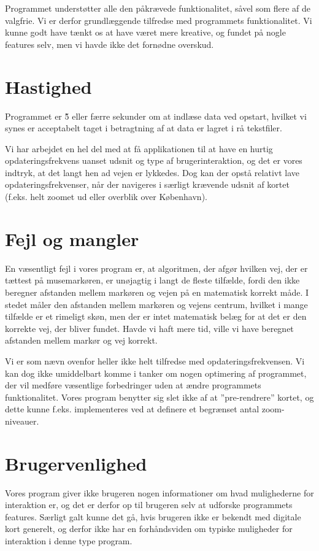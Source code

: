 Programmet understøtter alle den påkrævede funktionalitet, såvel som flere af de valgfrie. Vi er derfor grundlæggende tilfredse med programmets funktionalitet. Vi kunne godt have tænkt os at have været mere kreative, og fundet på nogle features selv, men vi havde ikke det fornødne overskud.

\section{Hastighed}

Programmet er \~5 eller færre sekunder om at indlæse data ved opstart, hvilket vi synes er acceptabelt taget i betragtning af at data er lagret i rå tekstfiler.

Vi har arbejdet en hel del med at få applikationen til at have en hurtig opdateringsfrekvens uanset udsnit og type af brugerinteraktion, og det er vores indtryk, at det langt hen ad vejen er lykkedes. Dog kan der opstå relativt lave opdateringsfrekvenser, når der navigeres i særligt krævende udsnit af kortet (f.eks. helt zoomet ud eller overblik over København).

\section{Fejl og mangler}

En væsentligt fejl i vores program er, at algoritmen, der afgør hvilken vej, der er tættest på musemarkøren, er unøjagtig i langt de fleste tilfælde, fordi den ikke beregner afstanden mellem markøren og vejen på en matematisk korrekt måde. I stedet måler den afstanden mellem markøren og vejens centrum, hvilket i mange tilfælde er et rimeligt skøn, men der er intet matematisk belæg for at det er den korrekte vej, der bliver fundet. Havde vi haft mere tid, ville vi have beregnet afstanden mellem markør og vej korrekt.

Vi er som nævn ovenfor heller ikke helt tilfredse med opdateringsfrekvensen. Vi kan dog ikke umiddelbart komme i tanker om nogen optimering af programmet, der vil medføre væsentlige forbedringer uden at ændre programmets funktionalitet. Vores program benytter sig slet ikke af at ''pre-rendrere'' kortet, og dette kunne f.eks. implementeres ved at definere et begrænset antal zoom-niveauer.

\section{Brugervenlighed}

Vores program giver ikke brugeren nogen informationer om hvad mulighederne for interaktion er, og det er derfor op til brugeren selv at udforske programmets features. Særligt galt kunne det gå, hvis brugeren ikke er bekendt med digitale kort generelt, og derfor ikke har en forhåndsviden om typiske muligheder for interaktion i denne type program.
